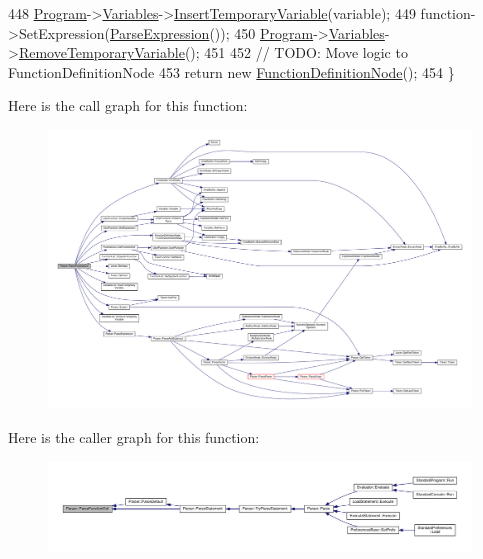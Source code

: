\begin{DoxyCode}
448     \hyperlink{classProgram}{Program}->\hyperlink{classProgram_a1d4f53befb0270e64c91c24d14061188}{Variables}->\hyperlink{classVariableList_a4e8c2b729d346ff56cf01c5349931c62}{InsertTemporaryVariable}(variable);
449     \textcolor{keyword}{function}->SetExpression(\hyperlink{classParser_ae46b0a87abe76f40ae117c5bdcb2f29d}{ParseExpression}());
450     \hyperlink{classProgram}{Program}->\hyperlink{classProgram_a1d4f53befb0270e64c91c24d14061188}{Variables}->\hyperlink{classVariableList_a489608dbcd6989a9ffd4092234a8052c}{RemoveTemporaryVariable}();
451 
452     \textcolor{comment}{// TODO: Move logic to FunctionDefinitionNode}
453     \textcolor{keywordflow}{return} \textcolor{keyword}{new} \hyperlink{classFunctionDefinitionNode}{FunctionDefinitionNode}();
454 \}
\end{DoxyCode}


Here is the call graph for this function\+:
\nopagebreak
\begin{figure}[H]
\begin{center}
\leavevmode
\includegraphics[width=350pt]{d0/d40/classParser_a0e8b1f794af2b9923bc3fcb7498004f9_cgraph}
\end{center}
\end{figure}




Here is the caller graph for this function\+:
\nopagebreak
\begin{figure}[H]
\begin{center}
\leavevmode
\includegraphics[width=350pt]{d0/d40/classParser_a0e8b1f794af2b9923bc3fcb7498004f9_icgraph}
\end{center}
\end{figure}


